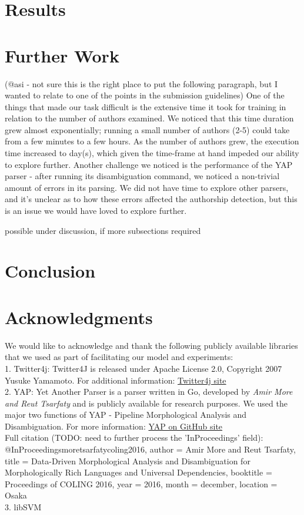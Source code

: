 \documentclass[a4paper]{article}
\begin{document}
\section{Results}
\label{Results}

\section{Further Work}
\label{Further Work}
(@asi - not sure this is the right place to put the following paragraph, but I wanted to relate to one of the points in the submission guidelines)
One of the things that made our task difficult is the extensive time it took for training in relation to the number of authors examined. We noticed that this time duration grew almost exponentially; running a small number of authors (2-5) could take from a few minutes to a few hours. As the number of authors grew, the execution time increased to day(s), which given the time-frame at hand impeded our ability to explore further.
Another challenge we noticed is the performance of the YAP parser - after running its disambiguation command, we noticed a non-trivial amount of errors in its parsing. We did not have time to explore other parsers, and it's unclear as to how these errors affected the authorship detection, but this is an issue we would have loved to explore further.

possible under discussion, if more subsections required
\section{Conclusion}
\label{Conclusion}

\section{Acknowledgments}
\label{Acknowledgements}
We would like to acknowledge and thank the following publicly available libraries that we used as part of facilitating our model and experiments:\\
1. Twitter4j: Twitter4J is released under Apache License 2.0, Copyright 2007 Yusuke Yamamoto. For additional information: 
	\href{http://twitter4j.org/en/index.html}{Twitter4j site}\\
2. YAP: Yet Another Parser is a parser written in Go, developed by \emph{Amir More and Reut Tsarfaty} and is publicly available for research purposes. We used the major two functions of YAP - Pipeline Morphological Analysis and Disambiguation. For more information: 
		\href{https://github.com/habeanf/yap}{YAP on GitHub site}\\
Full citation (TODO: need to further process the 'InProceedings' field):\\
@InProceedings{moretsarfatycoling2016,
  author = {Amir More and Reut Tsarfaty},
  title = {Data-Driven Morphological Analysis and Disambiguation for Morphologically Rich Languages and Universal Dependencies},
  booktitle = {Proceedings of COLING 2016},
  year = {2016},
  month = {december},
  location = {Osaka}
}\\
3. libSVM\\
\end{document}
